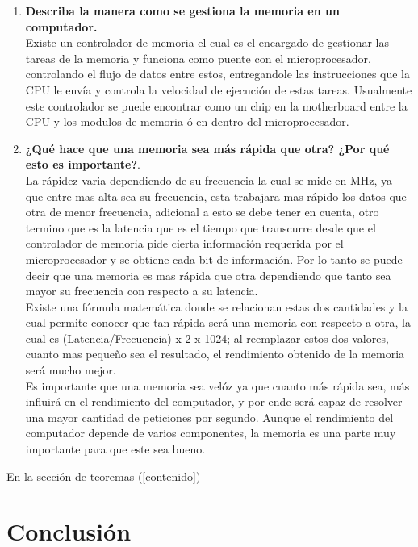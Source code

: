 \documentclass{article}
\begin{document}
\begin{enumerate}
\begin{enumerate}
    \end{enumerate}
    
    \item \textbf{Describa la manera como se gestiona la memoria en un computador.}\\
    Existe un controlador de memoria el cual es el encargado de gestionar las tareas de la memoria y funciona como puente con el microprocesador, controlando el flujo de datos entre estos, entregandole las instrucciones que la CPU le envía y controla la velocidad de ejecución de estas tareas. Usualmente este controlador se puede encontrar como un chip en la motherboard entre la CPU y los modulos de memoria ó en dentro del microprocesador. \cite{augusto}
    \item \textbf{¿Qué hace que una memoria sea más rápida que otra? ¿Por qué esto es importante?}.\\
    La rápidez varia dependiendo de su frecuencia la cual se mide en MHz, ya que entre mas alta sea su frecuencia, esta trabajara mas rápido los datos que otra de menor frecuencia, adicional a esto se debe tener en cuenta, otro termino que es la latencia que es el tiempo que transcurre desde que el controlador de memoria pide cierta información requerida por el microprocesador y se obtiene cada bit de información. Por lo tanto se puede decir que una memoria es mas rápida que otra dependiendo que tanto sea mayor su frecuencia con respecto a su latencia.\cite{hardzone}\\
    Existe una fórmula matemática donde se relacionan estas dos cantidades y la cual permite conocer que tan rápida será una memoria con respecto a otra, la cual es (Latencia/Frecuencia) x 2 x 1024; \cite{computer} al reemplazar estos dos valores, cuanto mas pequeño sea el resultado, el rendimiento obtenido de la memoria será mucho mejor.\\
    Es importante que una memoria sea velóz ya que cuanto más rápida sea, más influirá en el rendimiento del computador, y por ende será capaz de resolver una mayor cantidad de peticiones por segundo. Aunque el rendimiento del computador depende de varios componentes, la memoria es una parte muy importante para que este sea bueno. \cite{computer}
    
\end{enumerate}

En la sección de teoremas (\ref{contenido})

\section{Conclusión} \label{conclusion}



\end{document}
